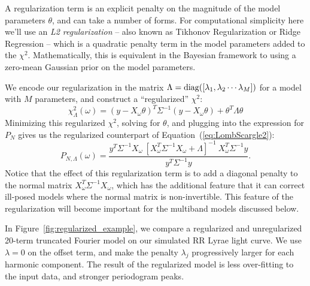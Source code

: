 \documentclass[12pt,preprint]{aastex}
\newcommand{\Fig}[1]{Figure~\ref{fig:#1}}
\newcommand{\fig}[1]{\Fig{#1}}
\newcommand{\Eq}[1]{Equation~(\ref{eq:#1})}
\newcommand{\eq}[1]{\Eq{#1}}
\newcommand{\eqlabel}[1]{\label{eq:#1}}
\begin{document}
A regularization term is an explicit penalty on the magnitude of the model parameters $\theta$, and can take a number of forms. For computational simplicity here we'll use an {\it L2 regularization} -- also known as Tikhonov Regularization \citep{Tikhonov1963} or Ridge Regression \citep{Hoerl1970} -- which is a quadratic penalty term in the model parameters added to the $\chi^2$. Mathematically, this is equivalent in the Bayesian framework to using a zero-mean Gaussian prior on the model parameters.

We encode our regularization in the matrix $\Lambda = {\rm diag}([\lambda_1, \lambda_2 \cdots \lambda_M])$ for a model with $M$ parameters, and construct a ``regularized'' $\chi^2$:
\begin{equation}
  \eqlabel{chi2reg}
  \chi_\Lambda^2(\omega) = (y - X_\omega\theta)^T\Sigma^{-1}(y - X_\omega\theta) + \theta^T\Lambda\theta
\end{equation}
Minimizing this regularized $\chi^2$, solving for $\theta$, and plugging into the expression for $P_N$ gives us the regularized counterpart of \eq{LombScargle2}:
\begin{equation}
  \eqlabel{LombScargleReg}
  P_{N,\Lambda}(\omega) = \frac{y^T\Sigma^{-1}X_\omega~[X_\omega^T\Sigma^{-1}X_\omega + \Lambda]^{-1}~X_\omega^T\Sigma^{-1}y}{y^T\Sigma^{-1}y}.
\end{equation}
Notice that the effect of this regularization term is to add a diagonal penalty to the normal matrix $X_\omega^T\Sigma^{-1}X_\omega$, which has the additional feature that it can correct ill-posed models where the normal matrix is non-invertible. This feature of the regularization will become important for the multiband models discussed below.

In \fig{regularized_example}, we compare a regularized and unregularized 20-term truncated Fourier model on our simulated RR Lyrae light curve. We use $\lambda = 0$ on the offset term, and make the penalty $\lambda_j$ progressively larger for each harmonic component. The result of the regularized model is less over-fitting to the input data, and stronger periodogram peaks.
\end{document}
